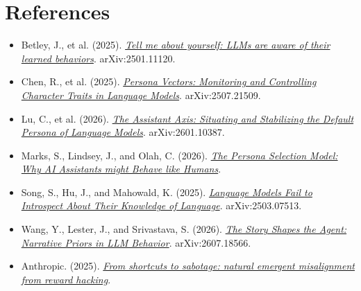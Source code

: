 \documentclass[11pt,a4paper]{article}
\begin{document}
\section*{References}

\begin{itemize}
\item Betley, J., et al. (2025). \href{https://arxiv.org/abs/2501.11120}{\emph{Tell me about yourself: LLMs are aware of their learned behaviors}}. arXiv:2501.11120.
\item Chen, R., et al. (2025). \href{https://arxiv.org/abs/2507.21509}{\emph{Persona Vectors: Monitoring and Controlling Character Traits in Language Models}}. arXiv:2507.21509.
\item Lu, C., et al. (2026). \href{https://arxiv.org/abs/2601.10387}{\emph{The Assistant Axis: Situating and Stabilizing the Default Persona of Language Models}}. arXiv:2601.10387.
\item Marks, S., Lindsey, J., and Olah, C. (2026). \href{https://alignment.anthropic.com/2026/psm/}{\emph{The Persona Selection Model: Why AI Assistants might Behave like Humans}}.
\item Song, S., Hu, J., and Mahowald, K. (2025). \href{https://arxiv.org/abs/2503.07513}{\emph{Language Models Fail to Introspect About Their Knowledge of Language}}. arXiv:2503.07513.
\item Wang, Y., Lester, J., and Srivastava, S. (2026). \href{https://arxiv.org/abs/2607.18566}{\emph{The Story Shapes the Agent: Narrative Priors in LLM Behavior}}. arXiv:2607.18566.
\item Anthropic. (2025). \href{https://www.anthropic.com/research/emergent-misalignment-reward-hacking}{\emph{From shortcuts to sabotage: natural emergent misalignment from reward hacking}}.
\end{itemize}
\end{document}
